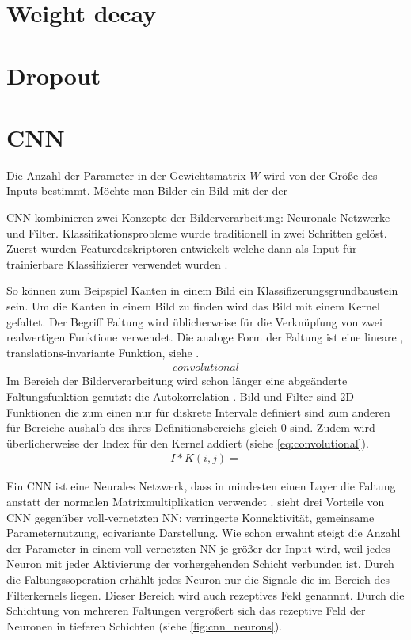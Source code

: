 \section{Weight decay}
\section{Dropout}



\section{CNN}
Die Anzahl der Parameter in der Gewichtsmatrix \(W\) wird von der Größe des Inputs bestimmt.
Möchte man Bilder ein Bild mit der der 

CNN kombinieren zwei Konzepte der Bilderverarbeitung: Neuronale Netzwerke und Filter.
Klassifikationsprobleme wurde traditionell in zwei Schritten gelöst. Zuerst wurden 
Featuredeskriptoren entwickelt welche dann als Input für trainierbare Klassifizierer 
verwendet wurden \autocite[2353]{RawatDeepConvolutionalNeural2017}.


So können zum Beipspiel Kanten in einem Bild ein Klassifizerungsgrundbaustein sein. 
Um die Kanten in einem Bild zu finden wird das Bild mit einem Kernel  gefaltet.  
Der Begriff Faltung wird üblicherweise für die Verknüpfung von zwei realwertigen Funktione verwendet. Die analoge Form der Faltung ist eine lineare , translations-invariante Funktion, siehe \cite[28]{SusseBildverarbeitungundObjekterkennung2014}. 
\begin{align}
    \label{eq:convolutional}
    convolutional
\end{align}
Im Bereich der Bilderverarbeitung wird schon länger eine abgeänderte Faltungsfunktion genutzt: die Autokorrelation . Bild und Filter sind 2D-Funktionen die zum einen nur für diskrete Intervale definiert sind zum anderen für Bereiche aushalb des ihres Definitionsbereichs gleich 0 sind. Zudem wird überlicherweise der Index für den Kernel addiert (siehe \cref{eq:convolutional}).
\begin{align}
    \label{eq:crosscorrelation}
    I*K(i,j) =
\end{align}


Ein CNN ist eine Neurales Netzwerk, dass in mindesten einen Layer die Faltung anstatt der normalen Matrixmultiplikation verwendet \parencite[321]{GoodfellowDeeplearning2016}.
\cite{GoodfellowDeeplearning2016} sieht drei Vorteile von CNN gegenüber voll-vernetzten NN: verringerte Konnektivität, 
gemeinsame Parameternutzung, eqivariante Darstellung.
Wie schon erwahnt steigt die Anzahl der Parameter in einem voll-vernetzten NN je größer der Input wird, weil jedes Neuron mit jeder Aktivierung der vorhergehenden Schicht verbunden ist. 
Durch die Faltungssoperation erhählt jedes Neuron nur die Signale die im Bereich des Filterkernels liegen. Dieser Bereich wird auch rezeptives Feld genannnt.
Durch die Schichtung von mehreren Faltungen vergrößert sich das rezeptive Feld der Neuronen in tieferen Schichten (siehe \cref{fig:cnn_neurons}).



